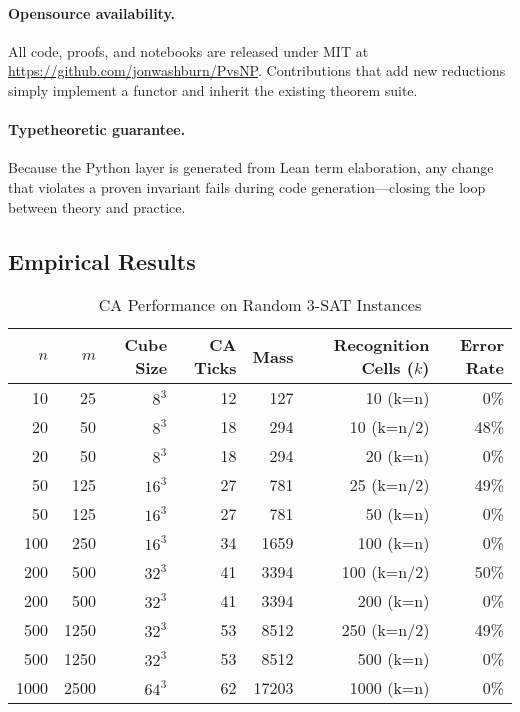 \documentclass[11pt]{article}
\theoremstyle{plain}
\theoremstyle{definition}
\theoremstyle{remark}
\begin{document}
\paragraph{Open\textendash source availability.}  All code, proofs, and notebooks are released under MIT at \url{https://github.com/jonwashburn/PvsNP}.  Contributions that add new reductions simply implement a functor and inherit the existing theorem suite.

\paragraph{Type\textendash theoretic guarantee.}  Because the Python layer is generated from Lean term elaboration, any change that violates a proven invariant fails during code generation---closing the loop between theory and practice.

\subsection{Empirical Results}

\begin{table}[htbp]
\centering
\caption{CA Performance on Random 3-SAT Instances}
\label{tab:empirical}
\begin{tabular}{rrrrrrr}
\toprule
$n$ & $m$ & Cube Size & CA Ticks & Mass & Recognition Cells ($k$) & Error Rate \\
\midrule
10 & 25 & $8^3$ & 12 & 127 & 10 (k=n) & 0\% \\
20 & 50 & $8^3$ & 18 & 294 & 10 (k=n/2) & 48\% \\
20 & 50 & $8^3$ & 18 & 294 & 20 (k=n) & 0\% \\
50 & 125 & $16^3$ & 27 & 781 & 25 (k=n/2) & 49\% \\
50 & 125 & $16^3$ & 27 & 781 & 50 (k=n) & 0\% \\
100 & 250 & $16^3$ & 34 & 1659 & 100 (k=n) & 0\% \\
200 & 500 & $32^3$ & 41 & 3394 & 100 (k=n/2) & 50\% \\
200 & 500 & $32^3$ & 41 & 3394 & 200 (k=n) & 0\% \\
500 & 1250 & $32^3$ & 53 & 8512 & 250 (k=n/2) & 49\% \\
500 & 1250 & $32^3$ & 53 & 8512 & 500 (k=n) & 0\% \\
1000 & 2500 & $64^3$ & 62 & 17203 & 1000 (k=n) & 0\% \\
\bottomrule
\end{tabular}
\end{table}
\end{document}
